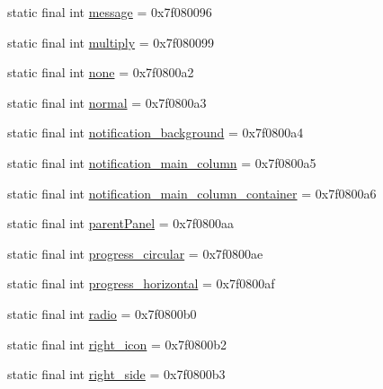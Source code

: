 \begin{DoxyCompactItemize}
\item 
static final int \mbox{\hyperlink{classandroid_1_1support_1_1v7_1_1appcompat_1_1R_1_1id_ae113da02d5d7919e91a660272de7ccfd}{message}} = 0x7f080096
\item 
static final int \mbox{\hyperlink{classandroid_1_1support_1_1v7_1_1appcompat_1_1R_1_1id_a14cfaf6f4360cc8f1e3332ec93886e86}{multiply}} = 0x7f080099
\item 
static final int \mbox{\hyperlink{classandroid_1_1support_1_1v7_1_1appcompat_1_1R_1_1id_a2b9b27749df31be95628596f649f3ca6}{none}} = 0x7f0800a2
\item 
static final int \mbox{\hyperlink{classandroid_1_1support_1_1v7_1_1appcompat_1_1R_1_1id_a01096d8e5c89f3536cd9ff277e50aa6d}{normal}} = 0x7f0800a3
\item 
static final int \mbox{\hyperlink{classandroid_1_1support_1_1v7_1_1appcompat_1_1R_1_1id_a9bbdf5432a3500d33bbeb37a51058389}{notification\+\_\+background}} = 0x7f0800a4
\item 
static final int \mbox{\hyperlink{classandroid_1_1support_1_1v7_1_1appcompat_1_1R_1_1id_a73287491f4ceeb078845e8636a6635f1}{notification\+\_\+main\+\_\+column}} = 0x7f0800a5
\item 
static final int \mbox{\hyperlink{classandroid_1_1support_1_1v7_1_1appcompat_1_1R_1_1id_a2bcf1e74994a4638238f397ad0922686}{notification\+\_\+main\+\_\+column\+\_\+container}} = 0x7f0800a6
\item 
static final int \mbox{\hyperlink{classandroid_1_1support_1_1v7_1_1appcompat_1_1R_1_1id_a908539fdb58bb6e7cbd117c4fa035dab}{parent\+Panel}} = 0x7f0800aa
\item 
static final int \mbox{\hyperlink{classandroid_1_1support_1_1v7_1_1appcompat_1_1R_1_1id_a78d6f86a1eb6df15a9a5c3b5afb779cf}{progress\+\_\+circular}} = 0x7f0800ae
\item 
static final int \mbox{\hyperlink{classandroid_1_1support_1_1v7_1_1appcompat_1_1R_1_1id_a9a5f8b44cd3e0ce5f6792da6c4a7189d}{progress\+\_\+horizontal}} = 0x7f0800af
\item 
static final int \mbox{\hyperlink{classandroid_1_1support_1_1v7_1_1appcompat_1_1R_1_1id_a0e1e03a536bddb0929ed81811e746003}{radio}} = 0x7f0800b0
\item 
static final int \mbox{\hyperlink{classandroid_1_1support_1_1v7_1_1appcompat_1_1R_1_1id_a1104bdea860d307012bf8f534ece89d7}{right\+\_\+icon}} = 0x7f0800b2
\item 
static final int \mbox{\hyperlink{classandroid_1_1support_1_1v7_1_1appcompat_1_1R_1_1id_aba43ec3cde39bb68e15b155b4ba2a313}{right\+\_\+side}} = 0x7f0800b3

\end{DoxyCompactItemize}
